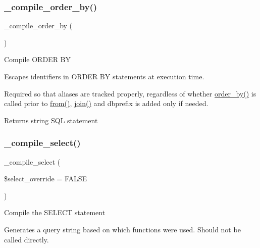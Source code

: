 \subsubsection{\texorpdfstring{\+\_\+compile\+\_\+order\+\_\+by()}{\_compile\_order\_by()}}
{\footnotesize\ttfamily \+\_\+compile\+\_\+order\+\_\+by (\begin{DoxyParamCaption}{ }\end{DoxyParamCaption})\hspace{0.3cm}{\ttfamily [protected]}}

Compile O\+R\+D\+ER BY

Escapes identifiers in O\+R\+D\+ER BY statements at execution time.

Required so that aliases are tracked properly, regardless of whether \mbox{\hyperlink{class_c_i___d_b__query__builder_a6d1ce6a3b22187165ce7d710ce91841d}{order\+\_\+by()}} is called prior to \mbox{\hyperlink{class_c_i___d_b__query__builder_a91f5f004ed8e2237a4decc5d23ac3457}{from()}}, \mbox{\hyperlink{class_c_i___d_b__query__builder_a54557b1ef757507cbbd2a8802a99810b}{join()}} and dbprefix is added only if needed.

\begin{DoxyReturn}{Returns}
string S\+QL statement 
\end{DoxyReturn}
\mbox{\label{class_c_i___d_b__query__builder_a441f6e994a212cfa12dd33d92973915b}} 
\subsubsection{\texorpdfstring{\+\_\+compile\+\_\+select()}{\_compile\_select()}}
{\footnotesize\ttfamily \+\_\+compile\+\_\+select (\begin{DoxyParamCaption}\item[{}]{\$select\+\_\+override = {\ttfamily FALSE} }\end{DoxyParamCaption})\hspace{0.3cm}{\ttfamily [protected]}}

Compile the S\+E\+L\+E\+CT statement

Generates a query string based on which functions were used. Should not be called directly.


